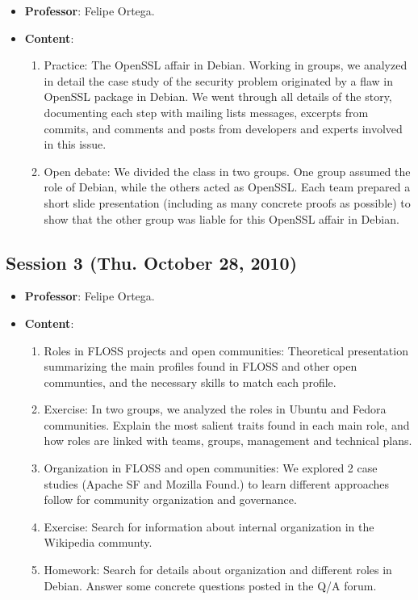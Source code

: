 \documentclass[a4paper]{article}
\begin{document}
\begin{itemize}
 \item \textbf{Professor}: Felipe Ortega.

 \item \textbf{Content}:

  \begin{enumerate}
   \item Practice: The OpenSSL affair in Debian. Working in groups, we analyzed in detail the case study of the security problem
originated by a flaw in OpenSSL package in Debian. We went through all details of the story, documenting each step with mailing
lists messages, excerpts from commits, and comments and posts from developers and experts involved in this issue.

   \item Open debate: We divided the class in two groups. One group assumed the role of Debian, while the others acted as OpenSSL. Each
team prepared a short slide presentation (including as many concrete proofs as possible) to show that the other group was liable for
this OpenSSL affair in Debian.
  \end{enumerate}

\end{itemize}

\subsection{Session 3 (Thu. October 28, 2010)}

  \begin{itemize}
   \item \textbf{Professor}: Felipe Ortega.

   \item \textbf{Content}:

   \begin{enumerate}
    \item Roles in FLOSS projects and open communities: Theoretical presentation summarizing the main profiles found in FLOSS and other
open communties, and the necessary skills to match each profile.

    \item Exercise: In two groups, we analyzed the roles in Ubuntu and Fedora communities. Explain the most salient traits found in each main
role, and how roles are linked with teams, groups, management and technical plans.

    \item Organization in FLOSS and open communities: We explored 2 case studies (Apache SF and Mozilla Found.) to learn different approaches
follow for community organization and governance.

    \item Exercise: Search for information about internal organization in the Wikipedia communty.

    \item Homework: Search for details about organization and different roles in Debian. Answer some concrete questions posted in the Q/A forum.
   \end{enumerate}

  \end{itemize}
\end{document}
